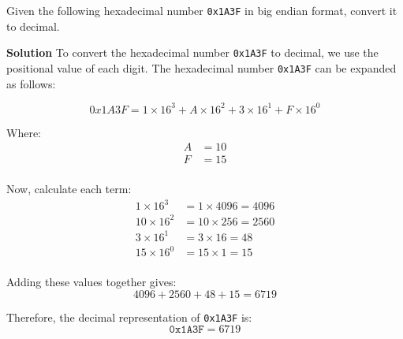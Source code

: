 Given the following hexadecimal number \texttt{0x1A3F} in big endian format, convert it to decimal.

\textbf{Solution}
To convert the hexadecimal number \texttt{0x1A3F} to decimal, we use the positional value of each digit. The hexadecimal number \texttt{0x1A3F} can be expanded as follows:

\[
0x1A3F = 1 \times 16^3 + A \times 16^2 + 3 \times 16^1 + F \times 16^0
\]

Where:
\begin{align*}
A & = 10 \\
F & = 15 \\
\end{align*}

Now, calculate each term:
\begin{align*}
1 \times 16^3 & = 1 \times 4096 = 4096 \\
10 \times 16^2 & = 10 \times 256 = 2560 \\
3 \times 16^1 & = 3 \times 16 = 48 \\
15 \times 16^0 & = 15 \times 1 = 15 \\
\end{align*}

Adding these values together gives:
\[
4096 + 2560 + 48 + 15 = 6719
\]

Therefore, the decimal representation of \texttt{0x1A3F} is:
\[
\texttt{0x1A3F} = 6719
\]